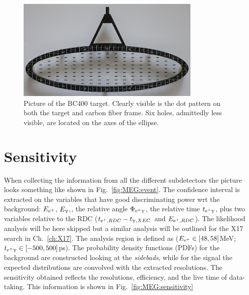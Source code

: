 \begin{refsection}
        \begin{figure}
            \centering
            \includegraphics[width = 0.8\textwidth]{Figures/MEG/meg_target.png}
            \caption{Picture of the BC400 target. Clearly visible is the dot pattern on both the target and carbon fiber frame. Six holes, admittedly less visible, are located on the axes of the ellipse.}
            \label{fig:meg:target}
        \end{figure}

\section{Sensitivity}  
    When collecting the information from all the different subdetectors the picture looks something like shown in Fig.~\ref{fig:MEG:event}.
    The confidence interval is extracted on the variables that have good discriminating power wrt the background: $E_{\text{e}^+}$, $E_\upgamma,$, the relative angle $\Phi_{\text{e}^+\upgamma}$, the relative time $t_{\text{e}^+\upgamma}$, plus two variables relative to the RDC ($t_{\text{e}^+, RDC}-t_{\upgamma, XEC}$ and $E_{\text{e}^+, RDC}$).
    The likelihood analysis will be here skipped but a similar analysis will be outlined for the X17 search in Ch.~\ref{ch:X17}.
    The analysis region is defined as ($E_{\text{e}^+}\in[48,58]$MeV; $t_{\text{e}^+\upgamma}\in[-500,500]$ps).
    The probability density functions (PDFs) for the background are constructed looking at the \textit{sidebads}, while for the signal the expected distributions are convolved with the extracted resolutions.
    The sensitivity obtained reflects the resolutions, efficiency, and the live time of data-taking. 
    This information is shown in Fig.~\ref{fig:MEG:sensitivity}
    

\end{refsection}
